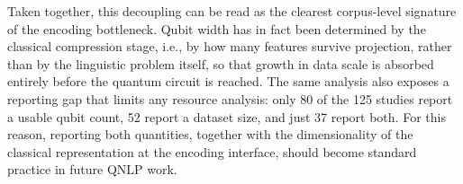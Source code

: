 \documentclass{ieeeaccess}
\begin{document}
Taken together, this decoupling can be read as the clearest corpus-level signature of the encoding bottleneck. Qubit width has in fact been determined by the classical compression stage, i.e., by how many features survive projection, rather than by the linguistic problem itself, so that growth in data scale is absorbed entirely before the quantum circuit is reached. The same analysis also exposes a reporting gap that limits any resource analysis: only 80 of the 125 studies report a usable qubit count, 52 report a dataset size, and just 37 report both. For this reason, reporting both quantities, together with the dimensionality of the classical representation at the encoding interface, should become standard practice in future QNLP work.




\EOD
\end{document}
